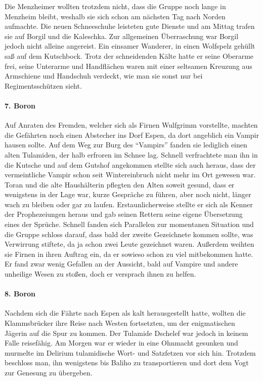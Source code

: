 Die Menzheimer wollten trotzdem nicht, dass die Gruppe noch lange in Menzheim bleibt, weshalb sie sich schon am nächsten Tag nach Norden aufmachte. Die neuen Schneeschuhe leisteten gute Dienste und am Mittag trafen sie auf Borgil und die Kaleschka. Zur allgemeinen Überraschung war Borgil jedoch nicht alleine angereist. Ein einsamer Wanderer, in einen Wolfspelz gehüllt saß auf dem Kutschbock. Trotz der schneidenden Kälte hatte er seine Oberarme frei, seine Unterarme und Handflächen waren mit einer seltsamen Kreuzung aus Armschiene und Handschuh verdeckt, wie man sie sonst nur bei Regimentsschützen sieht.

\paragraph{7. Boron}
Auf Anraten des Fremden, welcher sich als Firnen Wulfgrimm vorstellte, machten die Gefährten noch einen Abstecher ins Dorf Espen, da dort angeblich ein Vampir hausen sollte. Auf dem Weg zur Burg des ``Vampirs'' fanden sie lediglich einen alten Tulamiden, der halb erfroren im Schnee lag. Schnell verfrachtete man ihn in die Kutsche und auf dem Gutshof angekommen stellte sich auch heraus, dass der vermeintliche Vampir schon seit Wintereinbruch nicht mehr im Ort gewesen war. Toran und die alte Haushälterin pflegten den Alten soweit gesund, dass er wenigstens in der Lage war, kurze Gespräche zu führen, aber noch nicht, länger wach zu bleiben oder gar zu laufen. Erstaunlicherweise stellte er sich als Kenner der Prophezeiungen heraus und gab seinen Rettern seine eigene Übersetzung eines der Sprüche. Schnell fanden sich Parallelen zur momentanen Situation und die Gruppe schloss darauf, dass bald der zweite Gezeichnete kommen sollte, was Verwirrung stiftete, da ja schon zwei Leute gezeichnet waren. Außerdem weihten sie Firnen in ihren Auftrag ein, da er sowieso schon zu viel mitbekommen hatte. Er fand zwar wenig Gefallen an der Aussicht, bald auf Vampire und andere unheilige Wesen zu stoßen, doch er versprach ihnen zu helfen.

\paragraph{8. Boron}
Nachdem sich die Fährte nach Espen als kalt herausgestellt hatte, wollten die Klammsbrücker ihre Reise nach Westen fortsetzten, um der enigmatischen Jägerin auf die Spur zu kommen. Der Tulamide Dschelef war jedoch in keinem Falle reisefähig. Am Morgen war er wieder in eine Ohnmacht gesunken und murmelte im Delirium tulamidische Wort- und Satzfetzen vor sich hin. Trotzdem beschloss man, ihn wenigstens bis Baliho zu transportieren und dort dem Vogt zur Genesung zu übergeben.

